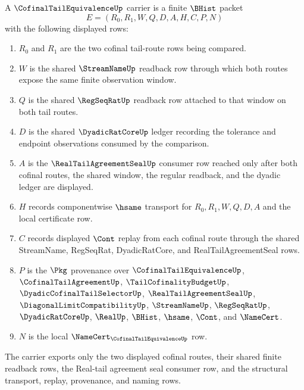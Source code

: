 \begin{definition}
\label{def:cofinal-tail-equivalence-carrier}
A $\CofinalTailEquivalenceUp$ carrier is a finite $\BHist$ packet
$$
E=(R_0,R_1,W,Q,D,A,H,C,P,N)
$$
with the following displayed rows:
\begin{enumerate}
\item $R_0$ and $R_1$ are the two cofinal tail-route rows being compared.
\item $W$ is the shared $\StreamNameUp$ readback row through which both routes expose the same finite observation window.
\item $Q$ is the shared $\RegSeqRatUp$ readback row attached to that window on both tail routes.
\item $D$ is the shared $\DyadicRatCoreUp$ ledger recording the tolerance and endpoint observations consumed by the comparison.
\item $A$ is the $\RealTailAgreementSealUp$ consumer row reached only after both cofinal routes, the shared window, the regular readback, and the dyadic ledger are displayed.
\item $H$ records componentwise $\hsame$ transport for $R_0,R_1,W,Q,D,A$ and the local certificate row.
\item $C$ records displayed $\Cont$ replay from each cofinal route through the shared StreamName, RegSeqRat, DyadicRatCore, and RealTailAgreementSeal rows.
\item $P$ is the $\Pkg$ provenance over $\CofinalTailEquivalenceUp$, $\CofinalTailAgreementUp$, $\TailCofinalityBudgetUp$, $\DyadicCofinalTailSelectorUp$, $\RealTailAgreementSealUp$, $\DiagonalLimitCompatibilityUp$, $\StreamNameUp$, $\RegSeqRatUp$, $\DyadicRatCoreUp$, $\RealUp$, $\BHist$, $\hsame$, $\Cont$, and $\NameCert$.
\item $N$ is the local $\NameCert_{\CofinalTailEquivalenceUp}$ row.
\end{enumerate}
The carrier exports only the two displayed cofinal routes, their shared finite readback rows, the Real-tail agreement seal consumer row, and the structural transport, replay, provenance, and naming rows.
\end{definition}

